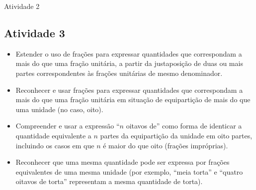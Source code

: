\begin{multicols}{2}
\begin{resposta*}{Atividade 2}
\end{resposta*}


  

\subsection{Atividade 3}

   \vspace{.1cm}
  
\begin{itemize} %
    \item       Estender o uso de frações para expressar quantidades que correspondam a mais do que uma fração unitária, a partir da justaposição de duas ou mais partes correspondentes às frações unitárias de mesmo denominador.
    \item       Reconhecer e usar frações para expressar quantidades que correspondam a mais do que uma fração unitária em situação de equipartição de mais do que uma unidade (no caso, oito).
    \item       Compreender e usar a expressão       ``$n$ oitavos de''       como forma de identicar a quantidade equivalente a       $n$       partes da equipartição da unidade em oito partes, incluindo os casos em que       $n$       é maior do que oito (frações impróprias).
    \item       Reconhecer que uma mesma quantidade pode ser expressa por frações equivalentes de uma mesma unidade (por exemplo,       ``meia torta''       e       ``quatro oitavos de torta''       representam a mesma quantidade de torta).
\end{itemize} %


  \vspace{.1cm}
  
  \vspace{.1cm}


\end{multicols}
